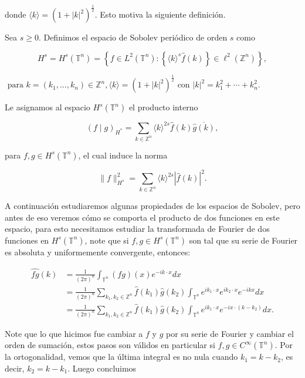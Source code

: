 \documentclass[12pt]{article}
\newcommand\Z{\ensuremath{\mathbb{Z}}}
\newcommand\T{\mathbb{T}}
\begin{document}
donde $\langle k\rangle=(1+|k|^2)^{\frac{1}{2}}$. Esto motiva la siguiente definición.


\begin{definition}
Sea $s \geq 0$. Definimos el espacio de Sobolev periódico de orden $s$ como

$$
H^s=H^s(\T^n)=\left\{f \in L^2(\T^n):\left\{\langle k\rangle^s \widehat{f}(k)\right\} \in \ell^2(\mathbb{Z}^n)\right\},
$$

$\text { para } k=\left(k_1, \ldots, k_n\right) \in \mathbb{Z}^n,\langle k\rangle=\left(1+|k|^2\right)^{\frac{1}{2}} \text { con }|k|^2=k_1^2+\cdots+k_n^2 \text {. }
$
\end{definition}

Le asignamos al espacio $H^s\left(\mathbb{T}^n\right)$ el producto interno

\begin{equation}
(f \mid g)_{H^*}=\sum_{k \in \mathbb{Z}^n}\langle k\rangle^{2 s} \widehat{f}(k) \overline{\widehat{g}(k)},
\end{equation}

para $f, g \in H^s\left(\mathbb{T}^n\right)$, el cual induce la norma

$$
\|f\|_{H^s}^2=\sum_{k \in \mathbb{Z}^n}\langle k\rangle^{2 s}|\widehat{f}(k)|^2.
$$

A continuación estudiaremos algunas propiedades de los espacios de Sobolev, pero antes de eso veremos cómo se comporta el producto de dos funciones en este espacio, para esto necesitamos estudiar la transformada de Fourier de dos funciones en $H^s(\T^n)$, note que si $f,g\in H^s(\T^n)$ son tal que su serie de Fourier es absoluta y uniformemente convergente, entonces:

$$\begin{aligned}
\widehat{f g}(k) & =\frac{1}{(2 \pi)^n} \int_{\T^n}(f g)(x) e^{-i k\cdot x} d x \\
& =\frac{1}{(2 \pi)^n} \sum_{k_1,k_2\in \Z^n} \widehat{f}\left(k_1\right) \widehat{g}\left(k_2\right) \int_{\T^n} e^{i k_1\cdot x} e^{i k_2\cdot x} e^{-i k x} d x \\
& =\frac{1}{(2 \pi)^n} \sum_{k_1,k_2\in \Z^n} \widehat{f}\left(k_1\right) \widehat{g}\left(k_2\right) \int_{\T^n}e^{i k_1\cdot x} e^{-i x\cdot\left(k-k_2\right)} d x .
\end{aligned}$$

Note que lo que hicimos fue cambiar a $f $ y $g$ por su serie de Fourier y cambiar el orden de sumación, estos pasos son válidos en particular si $f,g\in C^{\infty}(\T^n)$. Por la ortogonalidad, vemos que la última integral es no nula cuando $k_1=k-k_2$, es decir, $k_2=k-k_1$. Luego concluimos
\end{document}
